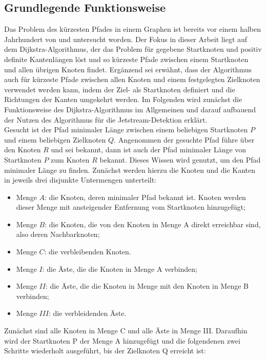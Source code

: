 \subsection{Grundlegende Funktionsweise}
Das Problem des kürzesten Pfades in einem Graphen ist bereits vor einem halben Jahrhundert von \citet{kruskal-1956} und \citet{dijkstra-1959} untersucht worden. Der Fokus in dieser Arbeit liegt auf dem Dijkstra-Algorithmus, der das Problem für gegebene Startknoten und positiv definite Kantenlängen löst und so kürzeste Pfade zwischen einem Startknoten und allen übrigen Knoten findet. Ergänzend sei erwähnt, dass der Algorithmus auch für kürzeste Pfade zwischen allen Knoten und einem festgelegten Zielknoten verwendet werden kann, indem der Ziel- als Startknoten definiert und die Richtungen der Kanten umgekehrt werden. Im Folgenden wird zunächst die Funktionsweise des Dijkstra-Algorithmus im Allgemeinen und darauf aufbauend der Nutzen des Algorithmus für die Jetstream-Detektion erklärt.
\\
Gesucht ist der Pfad minimaler Länge zwischen einem beliebigen Startknoten $P$ und einem beliebigen Zielknoten $Q$. Angenommen der gesuchte Pfad führe über den Knoten $R$ und sei bekannt, dann ist auch der Pfad minimaler Länge von Startknoten $P$ zum Knoten $R$ bekannt. Dieses Wissen wird genutzt, um den Pfad minimaler Länge zu finden. Zunächst werden hierzu die Knoten und die Kanten in jeweils drei disjunkte Untermengen unterteilt:
\begin{itemize}
  \item Menge $A$: die Knoten, deren minimaler Pfad bekannt ist. Knoten werden dieser Menge mit ansteigender Entfernung vom Startknoten hinzugefügt;
  \item Menge $B$: die Knoten, die von den Knoten in Menge A direkt erreichbar sind, also deren Nachbarknoten;
  \item Menge $C$: die verbleibenden Knoten.
  \\
  \item Menge $I$: die Äste, die die Knoten in Menge A verbinden;
  \item Menge $II$: die Äste, die die Knoten in Menge mit den Knoten in Menge B verbinden;
  \item Menge $III$: die verbleidenden Äste.
\end{itemize}
Zunächst sind alle Knoten in Menge C und alle Äste in Menge III. Daraufhin wird der Startknoten P der Menge A hinzugefügt und die folgendenen zwei Schritte wiederholt ausgeführt, bis der Zielknoten Q erreicht ist:
